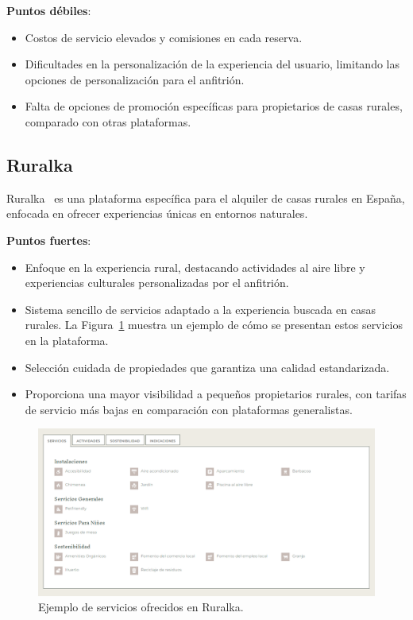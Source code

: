 \textbf{Puntos débiles}:
\begin{itemize}
    \item Costos de servicio elevados y comisiones en cada reserva.
    \item Dificultades en la personalización de la experiencia del usuario, limitando las opciones de personalización para el anfitrión.
    \item Falta de opciones de promoción específicas para propietarios de casas rurales, comparado con otras plataformas.
\end{itemize}

\subsection{Ruralka}
Ruralka~\cite{ruralka} es una plataforma específica para el alquiler de casas rurales en España, enfocada en ofrecer experiencias únicas en entornos naturales.

\textbf{Puntos fuertes}:
\begin{itemize}
    \item Enfoque en la experiencia rural, destacando actividades al aire libre y experiencias culturales personalizadas por el anfitrión.
    \item Sistema sencillo de servicios adaptado a la experiencia buscada en casas rurales. La Figura~\ref{fig:ruralka-servicios} muestra un ejemplo de cómo se presentan estos servicios en la plataforma.
    \item Selección cuidada de propiedades que garantiza una calidad estandarizada.
    \item Proporciona una mayor visibilidad a pequeños propietarios rurales, con tarifas de servicio más bajas en comparación con plataformas generalistas.
\end{itemize}

\begin{figure}[h!tb]
    \centering
    \includegraphics[width=1\textwidth]{figs/ruralka_servicios.png}
    \caption{Ejemplo de servicios ofrecidos en Ruralka.}
    \label{fig:ruralka-servicios}
\end{figure}

